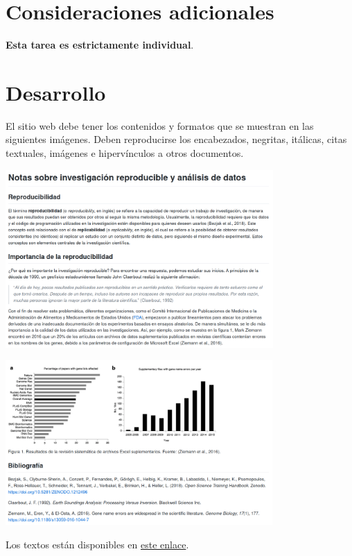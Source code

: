 \documentclass[
  letterpaper,
  DIV=11,
  numbers=noendperiod]{scrreprt}
\begin{document}
\hypertarget{consideraciones-adicionales}{%
\section*{Consideraciones
adicionales}\label{consideraciones-adicionales}}

\textbf{Esta tarea es estrictamente individual}.

\hypertarget{desarrollo}{%
\section*{Desarrollo}\label{desarrollo}}

El sitio web debe tener los contenidos y formatos que se muestran en las
siguientes imágenes. Deben reproducirse los encabezados, negritas,
itálicas, citas textuales, imágenes e hipervínculos a otros documentos.

\includegraphics[width=4.02in,height=\textheight]{./img/tarea-01-img-01.png}

\includegraphics[width=4.01in,height=\textheight]{./img/tarea-01-img-02.png}

Los textos están disponibles en \href{otros/tarea-01-texto.txt}{este
enlace}.
\end{document}

